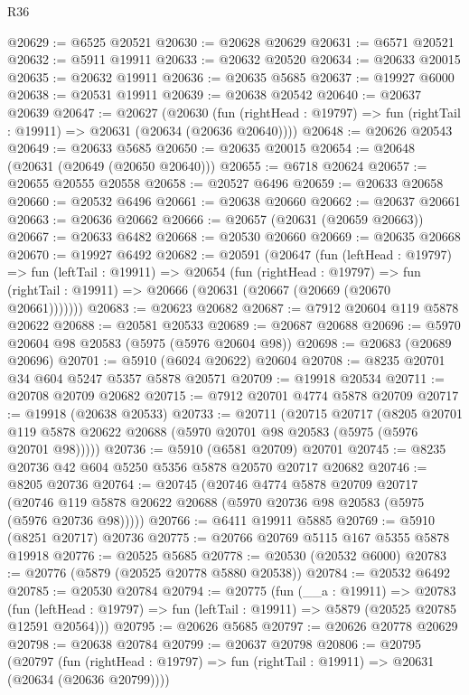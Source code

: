 \begin{lexlean}{R36}
\begin{coremodule}
@20629 := @6525 @20521
@20630 := @20628 @20629
@20631 := @6571 @20521
@20632 := @5911 @19911
@20633 := @20632 @20520
@20634 := @20633 @20015
@20635 := @20632 @19911
@20636 := @20635 @5685
@20637 := @19927 @6000
@20638 := @20531 @19911
@20639 := @20638 @20542
@20640 := @20637 @20639
@20647 := @20627
    (@20630
      (fun (rightHead : @19797) => fun (rightTail : @19911) => @20631 (@20634 (@20636 @20640))))
@20648 := @20626 @20543
@20649 := @20633 @5685
@20650 := @20635 @20015
@20654 := @20648 (@20631 (@20649 (@20650 @20640)))
@20655 := @6718 @20624
@20657 := @20655 @20555 @20558
@20658 := @20527 @6496
@20659 := @20633 @20658
@20660 := @20532 @6496
@20661 := @20638 @20660
@20662 := @20637 @20661
@20663 := @20636 @20662
@20666 := @20657 (@20631 (@20659 @20663))
@20667 := @20633 @6482
@20668 := @20530 @20660
@20669 := @20635 @20668
@20670 := @19927 @6492
@20682 := @20591
    (@20647
      (fun (leftHead : @19797) =>
      fun (leftTail : @19911) =>
      @20654
        (fun (rightHead : @19797) =>
        fun (rightTail : @19911) => @20666 (@20631 (@20667 (@20669 (@20670 @20661)))))))
@20683 := @20623 @20682
@20687 := @7912 @20604 @119 @5878 @20622
@20688 := @20581 @20533
@20689 := @20687 @20688
@20696 := @5970 @20604 @98 @20583 (@5975 (@5976 @20604 @98))
@20698 := @20683 (@20689 @20696)
@20701 := @5910 (@6024 @20622) @20604
@20708 := @8235 @20701 @34 @604 @5247 @5357 @5878 @20571
@20709 := @19918 @20534
@20711 := @20708 @20709 @20682
@20715 := @7912 @20701 @4774 @5878 @20709
@20717 := @19918 (@20638 @20533)
@20733 := @20711
    (@20715
      @20717
      (@8205 @20701 @119 @5878 @20622 @20688 (@5970 @20701 @98 @20583 (@5975 (@5976 @20701 @98)))))
@20736 := @5910 (@6581 @20709) @20701
@20745 := @8235 @20736 @42 @604 @5250 @5356 @5878 @20570 @20717 @20682
@20746 := @8205 @20736
@20764 := @20745
    (@20746
      @4774
      @5878
      @20709
      @20717
      (@20746 @119 @5878 @20622 @20688 (@5970 @20736 @98 @20583 (@5975 (@5976 @20736 @98)))))
@20766 := @6411 @19911 @5885
@20769 := @5910 (@8251 @20717) @20736
@20775 := @20766 @20769 @5115 @167 @5355 @5878 @19918
@20776 := @20525 @5685
@20778 := @20530 (@20532 @6000)
@20783 := @20776 (@5879 (@20525 @20778 @5880 @20538))
@20784 := @20532 @6492
@20785 := @20530 @20784
@20794 := @20775
    (fun (__a : @19911) =>
    @20783
      (fun (leftHead : @19797) => fun (leftTail : @19911) => @5879 (@20525 @20785 @12591 @20564)))
@20795 := @20626 @5685
@20797 := @20626 @20778 @20629
@20798 := @20638 @20784
@20799 := @20637 @20798
@20806 := @20795
    (@20797
      (fun (rightHead : @19797) => fun (rightTail : @19911) => @20631 (@20634 (@20636 @20799))))

\end{coremodule}
\end{lexlean}
